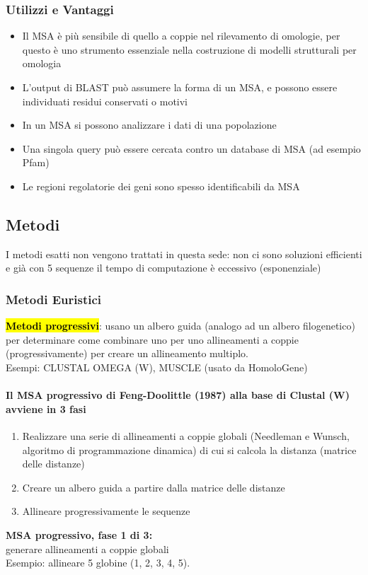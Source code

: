 \documentclass{article}
\begin{document}
\subsubsection{Utilizzi e Vantaggi}
    \begin{itemize}
        \item Il MSA è più sensibile di quello a coppie nel rilevamento di omologie, per questo è uno strumento essenziale nella costruzione di modelli strutturali per omologia
        \item L’output di BLAST può assumere la forma di un MSA, e possono essere individuati residui conservati o motivi
        \item In un MSA si possono analizzare i dati di una popolazione
        \item Una singola query può essere cercata contro un database di MSA (ad esempio Pfam)
        \item Le regioni regolatorie dei geni sono spesso identificabili da MSA
    \end{itemize}
\subsection{Metodi}
I metodi esatti non vengono trattati in questa sede: non ci sono soluzioni efficienti e già con 5 sequenze il tempo di computazione è eccessivo (esponenziale)
\subsubsection{Metodi Euristici}
\hl{\textbf{Metodi progressivi}}: usano un albero guida (analogo ad un albero filogenetico) per determinare come combinare uno per uno allineamenti a coppie
(progressivamente) per creare un allineamento multiplo.\\
\small{Esempi: CLUSTAL OMEGA (W), MUSCLE (usato da HomoloGene)}
\paragraph{Il MSA progressivo di Feng-Doolittle (1987) alla base di Clustal (W) avviene in 3 fasi}
\begin{enumerate}
    \item Realizzare una serie di allineamenti a coppie globali (Needleman e Wunsch, algoritmo di programmazione dinamica) di cui si calcola la distanza (matrice delle distanze)
    \item Creare un albero guida a partire dalla matrice delle distanze
    \item Allineare progressivamente le sequenze
\end{enumerate}
\textbf{MSA progressivo, fase 1 di 3:}\\
\normalsize{generare allineamenti a coppie globali}\\
\small{Esempio: allineare 5 globine (1, 2, 3, 4, 5).}\\
\end{document}
